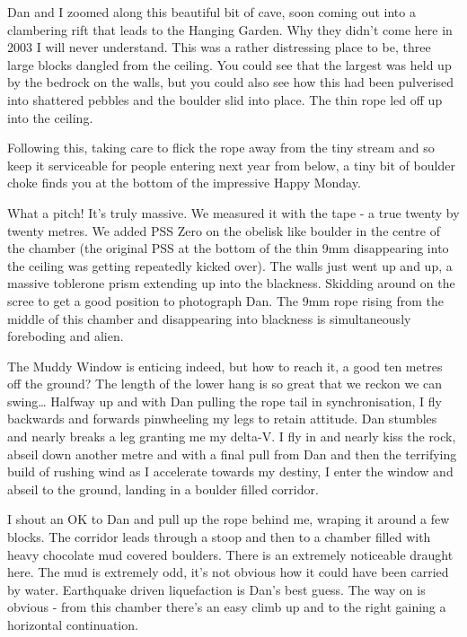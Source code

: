 Dan and I zoomed along this beautiful bit of cave, soon coming out into
a clambering rift that leads to the Hanging Garden. Why they didn't come
here in 2003 I will never understand. This was a rather distressing
place to be, three large blocks dangled from the ceiling. You could see
that the largest was held up by the bedrock on the walls, but you could
also see how this had been pulverised into shattered pebbles and the
boulder slid into place. The thin rope led off up into the ceiling.

Following this, taking care to flick the rope away from the tiny stream
and so keep it serviceable for people entering next year from below, a
tiny bit of boulder choke finds you at the bottom of the impressive
Happy Monday.

What a pitch! It's truly massive. We measured it with the tape - a true
twenty by twenty metres. We added PSS Zero on the obelisk like boulder
in the centre of the chamber (the original PSS at the bottom of the thin
9mm disappearing into the ceiling was getting repeatedly kicked over).
The walls just went up and up, a massive toblerone prism extending up
into the blackness. Skidding around on the scree to get a good position
to photograph Dan. The 9mm rope rising from the middle of this chamber
and disappearing into blackness is simultaneously foreboding and alien.

The Muddy Window is enticing indeed, but how to reach it, a good ten
metres off the ground? The length of the lower hang is so great that we
reckon we can swing\ldots{} Halfway up and with Dan pulling the rope
tail in synchronisation, I fly backwards and forwards pinwheeling my
legs to retain attitude. Dan stumbles and nearly breaks a leg granting
me my delta-V. I fly in and nearly kiss the rock, abseil down another
metre and with a final pull from Dan and then the terrifying build of
rushing wind as I accelerate towards my destiny, I enter the window and
abseil to the ground, landing in a boulder filled corridor.

I shout an OK to Dan and pull up the rope behind me, wraping it around a
few blocks. The corridor leads through a stoop and then to a chamber
filled with heavy chocolate mud covered boulders. There is an extremely
noticeable draught here. The mud is extremely odd, it's not obvious how
it could have been carried by water. Earthquake driven liquefaction is
Dan's best guess. The way on is obvious - from this chamber there's an
easy climb up and to the right gaining a horizontal continuation.

